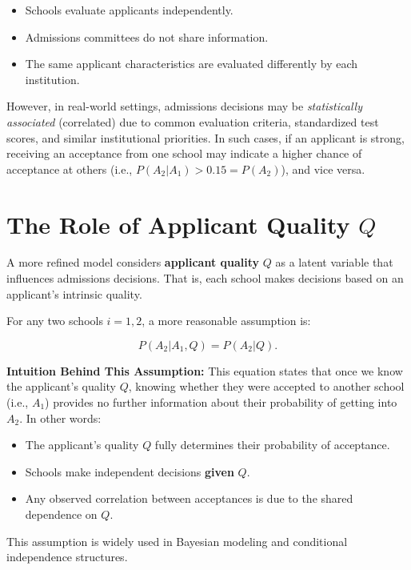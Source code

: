 \documentclass{article}
\begin{document}
\begin{itemize}
    \item Schools evaluate applicants independently.
    \item Admissions committees do not share information.
    \item The same applicant characteristics are evaluated differently by each institution.
\end{itemize}

However, in real-world settings, admissions decisions may be \textit{statistically associated} (correlated) due to common evaluation criteria, standardized test scores, and similar institutional priorities. In such cases, if an applicant is strong, receiving an acceptance from one school may indicate a higher chance of acceptance at others (i.e., \( P(A_2 | A_1) > 0.15 = P(A_2) \)), and vice versa.

\section{The Role of Applicant Quality \( Q \)}

A more refined model considers \textbf{applicant quality} \( Q \) as a latent variable that influences admissions decisions. That is, each school makes decisions based on an applicant's intrinsic quality.

For any two schools $i=1,2$, a more reasonable assumption is:

\[
P(A_2 | A_1, Q) = P(A_2 | Q).
\]

\textbf{Intuition Behind This Assumption:} \newline
This equation states that once we know the applicant’s quality \( Q \), knowing whether they were accepted to another school (i.e., \( A_1 \)) provides no further information about their probability of getting into \( A_2 \). In other words:

\begin{itemize}
    \item The applicant's quality \( Q \) fully determines their probability of acceptance.
    \item Schools make independent decisions \textbf{given} \( Q \).
    \item Any observed correlation between acceptances is due to the shared dependence on \( Q \).
\end{itemize}

This assumption is widely used in Bayesian modeling and conditional independence structures.
\end{document}
